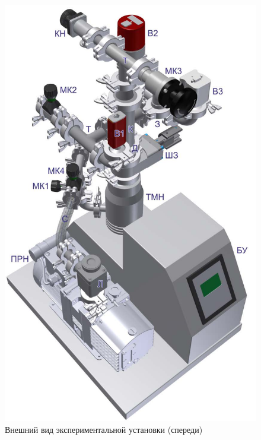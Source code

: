 \documentclass[a4paper,12pt]{article} %
\begin{document}
\begin{figure}[h]
\begin{center}
\begin{minipage}[h]{0.45\linewidth}
	\includegraphics[width=0.9\linewidth]{fig1.jpg}
	\caption{Внешний вид экспериментальной установки (спереди)} 
	\label{front}
\end{minipage}
\hfill
\begin{minipage}[h]{0.45\linewidth}

\end{minipage}
\end{center}
\end{figure}
\end{document}
